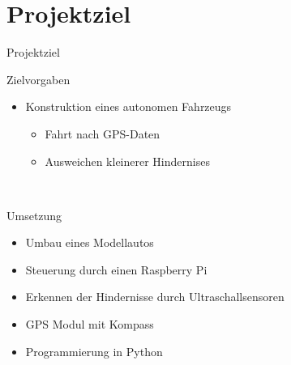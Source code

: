 \begin{frame}[label=title]{}
\titlepage
\end{frame}
\begin{frame}[label=title]{}
\tableofcontents
\end{frame}

\section{Projektziel}
\begin{frame}{Projektziel}
\begin{exampleblock}{Zielvorgaben}
\begin{itemize}
\item Konstruktion eines autonomen Fahrzeugs
\begin{itemize}
\item Fahrt nach GPS-Daten
\item Ausweichen kleinerer Hindernises
\end{itemize}
\end{itemize}
\end{exampleblock}
\\[0.5cm]
\begin{exampleblock}{Umsetzung}
\begin{itemize}
\item Umbau eines Modellautos
\item Steuerung durch einen Raspberry Pi
\item Erkennen der Hindernisse durch Ultraschallsensoren
\item GPS Modul mit Kompass
\item Programmierung in Python
\end{itemize}
\end{exampleblock}
\end{frame}

